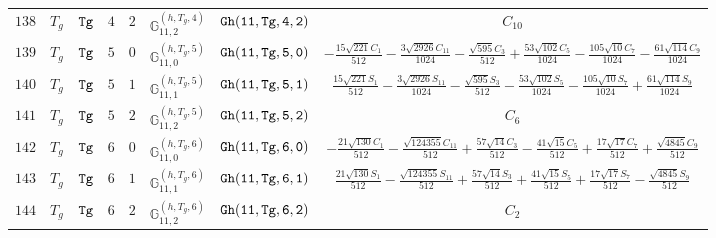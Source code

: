 \documentclass[fleqn,8pt]{jsarticle}
\begin{document}
\begin{table}[ht!]
\begin{center}
\begin{tabular}{cccccccc}
$ 138 $ & $ T_{g} $ & $ {\tt Tg} $ & $ 4 $ & $ 2 $ & $ \mathbb{G}_{11,2}^{(h,T_{g},4)} $ & $ {\tt Gh(11,Tg,4,2)} $ & $ C_{10} $ \\
$ 139 $ & $ T_{g} $ & $ {\tt Tg} $ & $ 5 $ & $ 0 $ & $ \mathbb{G}_{11,0}^{(h,T_{g},5)} $ & $ {\tt Gh(11,Tg,5,0)} $ & $ - \frac{15 \sqrt{221} C_{1}}{512} - \frac{3 \sqrt{2926} C_{11}}{1024} - \frac{\sqrt{595} C_{3}}{512} + \frac{53 \sqrt{102} C_{5}}{1024} - \frac{105 \sqrt{10} C_{7}}{1024} - \frac{61 \sqrt{114} C_{9}}{1024} $ \\
$ 140 $ & $ T_{g} $ & $ {\tt Tg} $ & $ 5 $ & $ 1 $ & $ \mathbb{G}_{11,1}^{(h,T_{g},5)} $ & $ {\tt Gh(11,Tg,5,1)} $ & $ \frac{15 \sqrt{221} S_{1}}{512} - \frac{3 \sqrt{2926} S_{11}}{1024} - \frac{\sqrt{595} S_{3}}{512} - \frac{53 \sqrt{102} S_{5}}{1024} - \frac{105 \sqrt{10} S_{7}}{1024} + \frac{61 \sqrt{114} S_{9}}{1024} $ \\
$ 141 $ & $ T_{g} $ & $ {\tt Tg} $ & $ 5 $ & $ 2 $ & $ \mathbb{G}_{11,2}^{(h,T_{g},5)} $ & $ {\tt Gh(11,Tg,5,2)} $ & $ C_{6} $ \\
$ 142 $ & $ T_{g} $ & $ {\tt Tg} $ & $ 6 $ & $ 0 $ & $ \mathbb{G}_{11,0}^{(h,T_{g},6)} $ & $ {\tt Gh(11,Tg,6,0)} $ & $ - \frac{21 \sqrt{130} C_{1}}{512} - \frac{\sqrt{124355} C_{11}}{512} + \frac{57 \sqrt{14} C_{3}}{512} - \frac{41 \sqrt{15} C_{5}}{512} + \frac{17 \sqrt{17} C_{7}}{512} + \frac{\sqrt{4845} C_{9}}{512} $ \\
$ 143 $ & $ T_{g} $ & $ {\tt Tg} $ & $ 6 $ & $ 1 $ & $ \mathbb{G}_{11,1}^{(h,T_{g},6)} $ & $ {\tt Gh(11,Tg,6,1)} $ & $ \frac{21 \sqrt{130} S_{1}}{512} - \frac{\sqrt{124355} S_{11}}{512} + \frac{57 \sqrt{14} S_{3}}{512} + \frac{41 \sqrt{15} S_{5}}{512} + \frac{17 \sqrt{17} S_{7}}{512} - \frac{\sqrt{4845} S_{9}}{512} $ \\
$ 144 $ & $ T_{g} $ & $ {\tt Tg} $ & $ 6 $ & $ 2 $ & $ \mathbb{G}_{11,2}^{(h,T_{g},6)} $ & $ {\tt Gh(11,Tg,6,2)} $ & $ C_{2} $ \\
 \hline \hline
\end{tabular}
\end{center}
\end{table}
\end{document}
